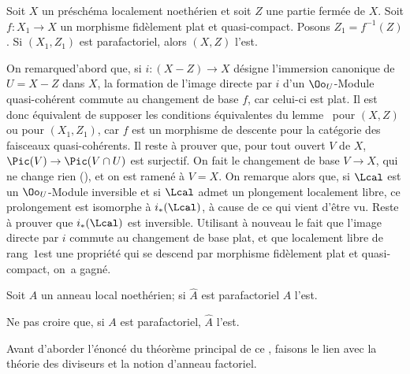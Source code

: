 \begin{lemme} \label{XI.3.6} Soit $X$ un pr\'esch\'ema localement noeth\'erien et soit $Z$ une partie ferm\'ee de $X$. Soit $f\colon X_1\to X$ un morphisme fid\`element plat et quasi-compact. Posons $Z_1=f^{-1}(Z)$. Si $(X_1, Z_1)$ est parafactoriel, alors $(X, Z)$ l'est.
\end{lemme}

On remarque\pageoriginale d'abord que, si $i\colon(X-Z)\to X$ d\'esigne l'immersion canonique de $U=X-Z$ dans $X$, la formation de l'image directe par $i$ d'un $\Oo_U$-Module quasi-coh\'erent commute au changement de base $f$, car celui-ci est plat. Il est donc \'equivalent de supposer les conditions \'equivalentes du lemme~ pour $(X, Z)$ ou pour $(X_1, Z_1)$, car $f$ est un morphisme de descente pour la cat\'egorie des faisceaux quasi-coh\'erents. Il reste \`a prouver que, pour tout ouvert $V$ de $X$, $\Pic(V)\to\Pic(V\cap U)$ est surjectif. On fait le changement de base $V\to X$, qui ne change rien (), et on est ramen\'e \`a $V=X$. On remarque alors que, si ${\Lcal}$ est un $\Oo_U$-Module inversible et si ${\Lcal}$ admet un plongement localement libre, ce prolongement est isomorphe \`a $i_*({\Lcal})$, \`a cause de ce qui vient d'\^etre vu. Reste \`a prouver que $i_*({\Lcal})$ est inversible. Utilisant \`a nouveau le fait que l'image directe par $i$ commute au changement de base plat, et que \og localement libre de rang~$1$\fg est une propri\'et\'e qui se descend par morphisme fid\`element plat et quasi-compact, on~a gagn\'e.

\begin{corollaire} \label{XI.3.7} Soit $A$ un anneau local noeth\'erien; si $\hat A$ est parafactoriel $A$ l'est.
\end{corollaire}

Ne pas croire que, si $A$ est parafactoriel, $\hat A$ l'est.

\danger

Avant d'aborder l'\'enonc\'e du th\'eor\`eme principal de ce \no, faisons le lien avec la th\'eorie des diviseurs et la notion d'anneau factoriel.

